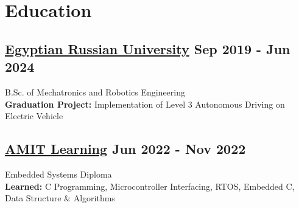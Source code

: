\section*{Education}
%
%
%
\subsection*{
  \href{https://www.eru.edu.eg/}{Egyptian Russian University}
  \hspace*{\fill}
  \dateformat Sep 2019 - Jun 2024
}
B.Sc. of Mechatronics and Robotics Engineering\\
\textbf{Graduation Project:} Implementation of Level 3 Autonomous Driving on Electric Vehicle
%
%
%
\subsection*{
  \href{https://amit-learning.com/}{AMIT Learning}
  \hspace*{\fill}
  \dateformat Jun 2022 - Nov 2022
}
Embedded Systems Diploma\\
\textbf{Learned:} C Programming, Microcontroller Interfacing, RTOS, Embedded C, Data Structure \& Algorithms